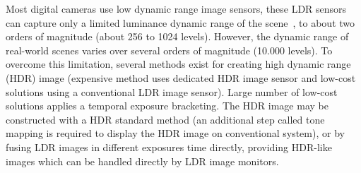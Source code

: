\documentclass[10pt,twocolumn,letterpaper]{article}
\begin{document}
 
\maketitle 


\acresetall  %
% 
%
%


Most digital cameras use low dynamic range image sensors, these LDR sensors can capture only a limited luminance dynamic range of the scene~\cite{hang2014}, to about two orders of magnitude (about 256 to 1024 levels). However, the dynamic range of real-world scenes varies over several orders of magnitude (10.000 levels). To overcome this limitation, several methods exist for creating high dynamic range (HDR) image (expensive method uses dedicated HDR image sensor and low-cost solutions using a conventional LDR image sensor). Large number of low-cost solutions applies a temporal exposure bracketing. The HDR image may be constructed with a HDR standard method (an additional step called tone mapping is required to display the HDR image on conventional system), or by fusing LDR images in different exposures time directly, providing HDR-like~\cite{Gelfand2010} images which can be handled directly by LDR image monitors.
\end{document}
